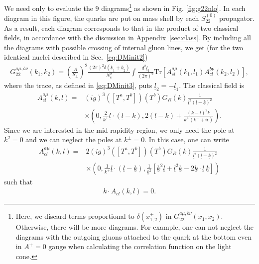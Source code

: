 \documentclass[onecolumn,showpacs,nobibnotes,nofootinbib,12pt,aps,prd,showpacs,notitlepage,nofootinbib,preprintnumbers,amsmath,amssymb]{article}
\newcommand{\un}[1]{\underline{#1}}
\newcommand{\Tr}{\mathrm{Tr}}
\begin{document}
We need only to evaluate the 9 diagrams\footnote{Here, we discard
  terms proportional to $\delta(x_{1,2}^\pm)$ in
  $G_{22}^{a\mu,b\nu}(x_1,x_2)$. Otherwise, there will be more
  diagrams. For example, one can not neglect the diagrams with the
  outgoing gluons attached to the quark at the bottom even in $A^+=0$
  gauge when calculating the correlation function on the light cone.}
as shown in Fig. \ref{fig:g22nlo}. In each diagram in this figure, the
quarks are put on mass shell by each $S^{(0)}_{22}$ propagator. As a
result, each diagram corresponds to that in the product of two
classical fields, in accordance with the discussion in
Appendix~\ref{sec:class}. By including all the diagrams with possible
crossing of internal gluon lines, we get (for the two identical nuclei
described in Sec.~\ref{eq:DMinit2})
\begin{align}\label{G22cl1}
  G_{22}^{a\mu,b\nu}(k_1,k_2)=\left(\frac{A}{S_\perp}\right)^2\frac{(2\pi)^2\delta(\underline{k}_1+\underline{k}_2)}{N_c^2}
  \int\frac{d^2 \underline{l}_1}{(2\pi)^2}\Tr[A_{cl}^{a\mu}(k_1,l_1)
  A_{cl}^{b\nu}(k_2,l_2)],
\end{align}
where the trace, as defined in \eqref{eq:DMinit3}, puts
$\un{l}_2=-\un{l}_1$. The classical field is
\begin{align}
  A_{cl}^{a\mu}(k,l)=&(ig)^3([T^a,T^b])(T^b)G_R(k)\frac{1}{\underline{l}^2 (\underline{l}-\underline{k})^2}\nonumber\\
  &\times\left(0, \frac{2}{k^+}
    \underline{l}\cdot(\underline{l}-\underline{k}),
    2(\underline{l}-\underline{k}) +
    \frac{(\underline{k}-\underline{l})^2\underline{k}}{k^+(k^-+i\epsilon)}\right).
\end{align}
Since we are interested in the mid-rapidity region, we only need the
pole at $k^2=0$ and we can neglect the poles at $k^\pm=0$. In this
case, one can write
\begin{align}\label{eq:ALC}
  A_{cl}^{a\mu}(k,l)=&2(ig)^3([T^a,T^b])(T^b)G_R(k)\frac{1}{\underline{l}^2 (\underline{l}-\underline{k})^2}\nonumber\\
  &\times\left(0, \frac{1}{k^+}
    \underline{l}\cdot(\underline{l}-\underline{k}),
    \frac{1}{\underline{k}^2}[\underline{k}^2 \underline{l} +
    \underline{l}^2 \underline{k} -2 \underline{k}\cdot
    \underline{l}~\underline{k}]\right)
\end{align}
such that
\begin{align}
k\cdot A_{cl}(k,l)=0.
\end{align}
\end{document}
